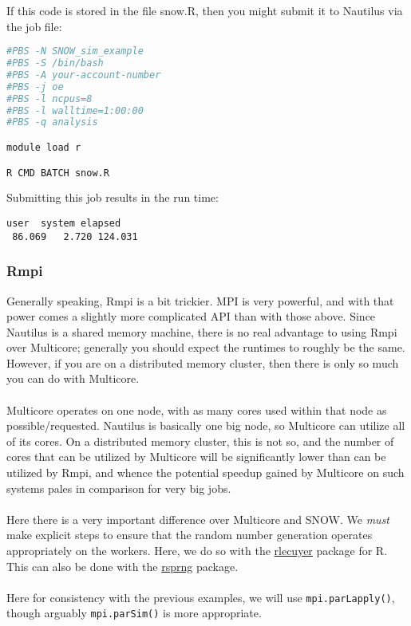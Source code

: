 If this code is stored in the file snow.R, then you might submit it to Nautilus via the job file:

\begin{lstlisting}[language=sh]
#PBS -N SNOW_sim_example
#PBS -S /bin/bash
#PBS -A your-account-number
#PBS -j oe
#PBS -l ncpus=8
#PBS -l walltime=1:00:00
#PBS -q analysis

module load r

R CMD BATCH snow.R
\end{lstlisting}%
Submitting this job results in the run time:
\begin{lstlisting}[language=rr]
   user  system elapsed 
 86.069   2.720 124.031 
\end{lstlisting}


\subsubsection{Rmpi}
Generally speaking, Rmpi is a bit trickier.  MPI is very powerful, and with that power comes a slightly more complicated API than with those above.  Since Nautilus is a shared memory machine, there is no real advantage to using Rmpi over Multicore; generally you should expect the runtimes to roughly be the same.  However, if you are on a distributed memory cluster, then there is only so much you can do with Multicore.  \\\\
%
Multicore operates on one node, with as many cores used within that node as possible/requested.  Nautilus is basically one big node, so Multicore can utilize all of its cores.  On a distributed memory cluster, this is not so, and the number of cores that can be utilized by Multicore will be significantly lower than can be utilized by Rmpi, and whence the potential speedup gained by Multicore on such systems pales in comparison for very big jobs.\\\\
%
Here there is a very important difference over Multicore and SNOW.  We \emph{must} make explicit steps to ensure that the random number generation operates appropriately on the workers.  Here, we do so with the \href{http://cran.r-project.org/web/packages/rlecuyer/index.html}{rlecuyer} package for R.  This can also be done with the \href{http://cran.r-project.org/web/packages/rsprng/index.html}{rsprng} package.\\\\
%
Here for consistency with the previous examples, we will use \texttt{mpi.parLapply()}, though arguably \texttt{mpi.parSim()} is more appropriate.  \\\\
